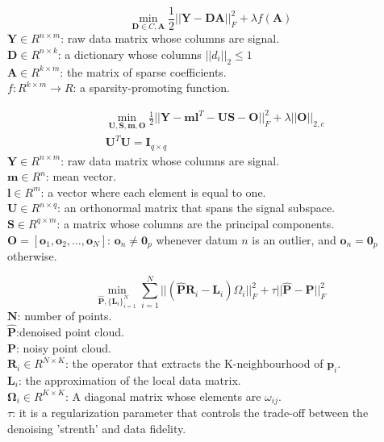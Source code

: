 \documentclass[10pt]{article}
\title{}
\date{}
\begin{document}
\maketitle
\mbox{} \\
$$\min_{\bm{D} \in C,\bm{A}} \frac{1}{2}||\bm{Y}-\bm{DA}||_F^{2}+\lambda f(\bm{A})$$
$\bm{Y} \in R^{n \times m}$: raw data matrix whose columns are signal.\\
$\bm{D} \in R^{n \times k}$: a dictionary whose columns $||d_i||_2 \leq 1$ \\
$\bm{A} \in R^{k \times m}$: the matrix of sparse coefficients. \\
$f: R^{k \times m} \to R$: a sparsity-promoting function.

$$
\begin{array}{rl}
& \min_{\bm{U},\bm{S},\bm{m},\bm{O}} \frac{1}{2} ||\bm{Y}-\bm{m}\bm{l}^T-\bm{U}\bm{S}-\bm{O}||_{F}^2+\lambda ||\bm{O}||_{2,c} \\
&\bm{U}^T\bm{U}=\bm{I}_{q \times q}
\end{array}
$$
$\bm{Y} \in R^{n \times m}$: raw data matrix whose columns are signal.\\
$\bm{m} \in R^n$: mean vector.\\
$\bm{l} \in R^m$: a vector where each element is equal to one.\\
$\bm{U} \in R^{n \times q}$: an orthonormal matrix that spans the signal subspace.\\
$\bm{S} \in R^{q \times m}$: a matrix whose columns are the principal components. \\
$\bm{O}=[\bm{o}_1,\bm{o}_2,\dots,\bm{o}_{N}]$: $\bm{o}_n \neq \bm{0}_p$ whenever datum $n$ is an outlier, and $\bm{o}_n=\bm{0}_p$ otherwise.

$$\min_{\hat{\bm{P}},\{\bm{L}_i\}_{i=1}^N}\sum_{i=1}^N||(\hat{\bm{P}}\bm{R}_i-\bm{L}_i)\Omega_i||_{F}^2+\tau||\hat{\bm{P}}-\bm{P}||_F^2$$
$\bm{N}$: number of points.\\
$\hat{\bm{P}}$:denoised point cloud. \\
$\bm{P}$: noisy point cloud.\\
$\bm{R}_i \in R^{N \times K}$: the operator that extracts the K-neighbourhood of $\bm{p}_i$.\\
$\bm{L}_i$: the approximation of the local data matrix.\\
$\bm{\Omega}_i \in R^{K \times K}$: A diagonal matrix whose elements are $\omega_{ij}$. \\
$\tau$: it is a regularization parameter that controls the trade-off between the denoising 'strenth' and data fidelity. \\
\end{document}
